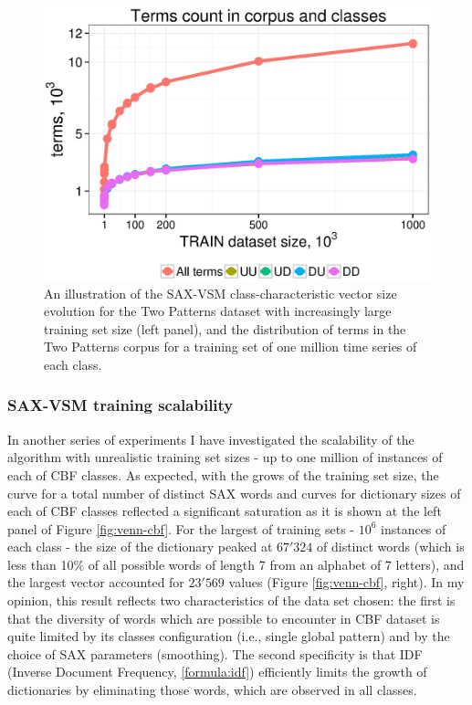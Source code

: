 \begin{figure}[t]
   \includegraphics[width=140mm]{figures/words-two-patterns.ps}
   \caption{An illustration of the SAX-VSM class-characteristic vector size evolution for the Two Patterns dataset 
   with increasingly large training set size (left panel), and the distribution of terms in the Two Patterns corpus for 
   a training set of one million time series of each class.}
   \label{fig:venn-2p}
\end{figure}

\subsubsection{SAX-VSM training scalability }
In another series of experiments I have investigated the scalability of the algorithm with
unrealistic training set sizes - up to one million of instances of each of CBF classes.
As expected, with the grows of the training set size, the curve for a total number of distinct SAX
words and curves for dictionary sizes of each of CBF classes reflected a significant saturation 
as it is shown at the left panel of Figure \ref{fig:venn-cbf}. 
For the largest of training sets - $10^6$ instances of each class - the size of the dictionary peaked at $67'324$ 
of distinct words (which is less than 10\% of all possible words of length 7 from an alphabet of 7 letters), 
and the largest \tfidf vector accounted for $23'569$ values (Figure \ref{fig:venn-cbf}, right). 
In my opinion, this result reflects two characteristics of the data set chosen: the first is that the diversity of words which 
are possible to encounter in CBF dataset is quite limited by its classes configuration (i.e., single global 
pattern) and by the choice of SAX parameters (smoothing). 
The second specificity is that IDF (Inverse Document Frequency, \ref{formula:idf})
efficiently limits the growth of dictionaries by eliminating those words, which are observed in all
classes. 

